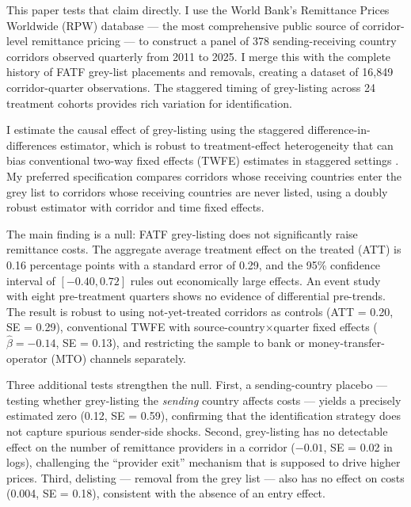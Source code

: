 \documentclass[12pt]{article}
\begin{document}
This paper tests that claim directly. I use the World Bank's Remittance Prices Worldwide (RPW) database --- the most comprehensive public source of corridor-level remittance pricing --- to construct a panel of 378 sending-receiving country corridors observed quarterly from 2011 to 2025. I merge this with the complete history of FATF grey-list placements and removals, creating a dataset of 16,849 corridor-quarter observations. The staggered timing of grey-listing across 24 treatment cohorts provides rich variation for identification.

I estimate the causal effect of grey-listing using the \citet{callaway2021} staggered difference-in-differences estimator, which is robust to treatment-effect heterogeneity that can bias conventional two-way fixed effects (TWFE) estimates in staggered settings \citep{goodmanbacon2021, dechaisemartin2020}. My preferred specification compares corridors whose receiving countries enter the grey list to corridors whose receiving countries are never listed, using a doubly robust estimator with corridor and time fixed effects.

The main finding is a null: FATF grey-listing does not significantly raise remittance costs. The aggregate average treatment effect on the treated (ATT) is 0.16 percentage points with a standard error of 0.29, and the 95\% confidence interval of $[-0.40, 0.72]$ rules out economically large effects. An event study with eight pre-treatment quarters shows no evidence of differential pre-trends. The result is robust to using not-yet-treated corridors as controls (ATT = 0.20, SE = 0.29), conventional TWFE with source-country$\times$quarter fixed effects ($\hat{\beta} = -0.14$, SE = 0.13), and restricting the sample to bank or money-transfer-operator (MTO) channels separately.

Three additional tests strengthen the null. First, a sending-country placebo --- testing whether grey-listing the \emph{sending} country affects costs --- yields a precisely estimated zero (0.12, SE = 0.59), confirming that the identification strategy does not capture spurious sender-side shocks. Second, grey-listing has no detectable effect on the number of remittance providers in a corridor ($-0.01$, SE = 0.02 in logs), challenging the ``provider exit'' mechanism that is supposed to drive higher prices. Third, delisting --- removal from the grey list --- also has no effect on costs (0.004, SE = 0.18), consistent with the absence of an entry effect.
\end{document}
